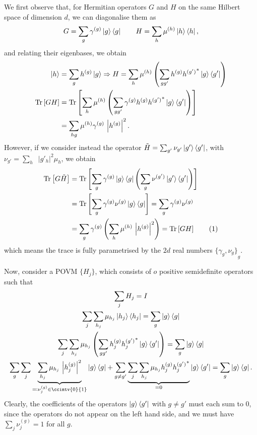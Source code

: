 \documentclass[10pt, a4paper]{article}
\numberwithin{equation}{section} %
\theoremstyle{definition}
\theoremstyle{plain}
\newcommand{\usenumber}{%
  \refstepcounter{equation}\tag{\theequation}
}
\newcommand{\abs}[1]{\mathop{}\left\lvert#1\right\rvert}
\newcommand{\?}{\mathrel{?}} %
\newcommand{\Tr}[2][]{\mathop{\mathrm{Tr}#1}\left[ #2 \right]} %
\begin{document}
\begin{appendices}
                            We first observe that, for Hermitian operators \(G\) and \(H\) on the same Hilbert space of dimension \(d\), we can diagonalise them as
                            \[ G = \sum_g \gamma^{(g)} \ket{g}\bra{g} \qquad H = \sum_h \mu^{(h)} \ket{h}\bra{h}, \]
                            and relating their eigenbases, we obtain
                            \begin{align}
                              \ket{h} &= \sum_g h^{(g)} \ket{g} \Rightarrow H = \sum_h \mu^{(h)} \left(\sum_{gg'} h^{(g)} {h^{(g')}}^* \ket{g}\bra{g'}\right) \\
                              \Tr{GH} &= \Tr{ \sum_h \mu^{(h)} \left( \sum_{gg'} \gamma^{(g)} h^{(g)} {h^{(g')}}^* \ket{g}\bra{g'} \right) } \\
                                      &= \sum_{hg} \mu^{(h)} \gamma^{(g)} \abs{h^{(g)}}^2.
                            \end{align}
                            However, if we consider instead the operator \(\tilde{H} = \sum_{g'} \nu_{g'} \ket{g'}\bra{g'}\), with \(\nu_{g'} = \sum_h \abs{g'_h}^2 \mu_h\), we obtain
                            \begin{align*}
                              \Tr{G\tilde{H}} &= \Tr{ \sum_{g} \gamma^{(g)} \ket{g}\bra{g} \left( \sum_g \nu^{(g')} \ket{g'}\bra{g'} \right) } \\
                                              &= \Tr{ \sum_{g} \gamma^{(g)}\nu^{(g)}\ket{g}\bra{g} } = \sum_{g} \gamma^{(g)}\nu^{(g)} \\
                                              &= \sum_{g} \gamma^{(g)} \left(\sum_{h} \mu^{(h)} \abs{h^{(g)}}^2\right) = \Tr{GH} \usenumber
                            \end{align*}
                            which means the trace is fully parametrised by the \(2d\) real numbers \({\{\gamma_g, \nu_{g}\}}_{g}\).

                            Now, consider a POVM \(\{H_j\}\), which consists of \(o\) positive semidefinite operators such that
                            \begin{gather*}
                              \sum_j H_j = I \\
                              \sum_j \sum_{h_j} \mu_{h_j} \ket{h_j}\bra{h_j} = \sum_g \ket{g}\bra{g} \\
                              \sum_j \sum_{h_j} \mu_{h_j} \left(\sum_{gg'} h_j^{(g)} {h_j^{(g')}}^* \ket{g}\bra{g'}\right) = \sum_g \ket{g}\bra{g} \\
                              \sum_{g} \sum_j \underbrace{\sum_{h_j} \mu_{h_j} \abs{h_j^{(g)}}^2}_{\eqqcolon \nu^{(g)}_j \in \ccintv{0}{1}} \ket{g}\bra{g} + \sum_{g \neq g'} \underbrace{ \sum_j \sum_{h_j} \mu_{h_j} h_j^{(g)} {h_j^{(g')}}^* }_{=0} \ket{g}\bra{g'} = \sum_g \ket{g}\bra{g}.
                            \end{gather*}
                            Clearly, the coefficients of the operators \(\ket{g}\bra{g'}\) with \(g \neq g'\) must each sum to 0, since the operators do not appear on the left hand side, and we must have \(\sum_j \nu^{(g)}_j = 1\) for all \(g\).


\end{appendices}
\end{document}
